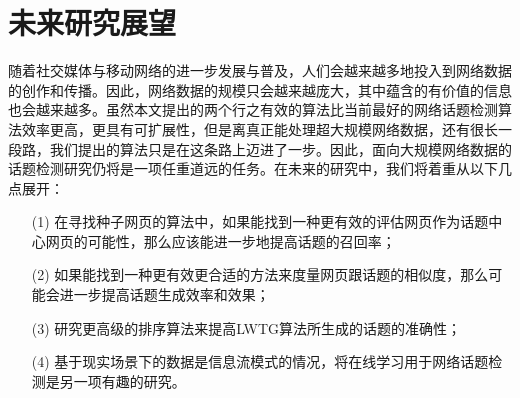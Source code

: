 \section{未来研究展望}

随着社交媒体与移动网络的进一步发展与普及，人们会越来越多地投入到网络数据的创作和传播。因此，网络数据的规模只会越来越庞大，其中蕴含的有价值的信息也会越来越多。虽然本文提出的两个行之有效的算法比当前最好的网络话题检测算法效率更高，更具有可扩展性，但是离真正能处理超大规模网络数据，还有很长一段路，我们提出的算法只是在这条路上迈进了一步。因此，面向大规模网络数据的话题检测研究仍将是一项任重道远的任务。在未来的研究中，我们将着重从以下几点展开：
\begin{enumerate}
	\item[(1)] 在寻找种子网页的算法中，如果能找到一种更有效的评估网页作为话题中心网页的可能性，那么应该能进一步地提高话题的召回率；
	\item[(2)] 如果能找到一种更有效更合适的方法来度量网页跟话题的相似度，那么可能会进一步提高话题生成效率和效果；
	\item[(3)] 研究更高级的排序算法来提高LWTG算法所生成的话题的准确性；
	\item[(4)] 基于现实场景下的数据是信息流模式的情况，将在线学习用于网络话题检测是另一项有趣的研究。
\end{enumerate}
